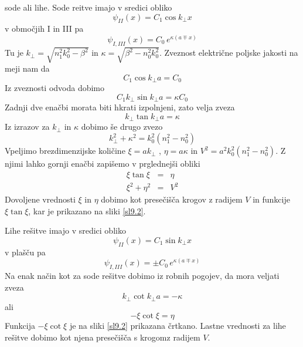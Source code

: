 \documentclass[11pt,fleqn]{book} %
\begin{document}
sode ali lihe. Sode re\textquotedbl{}itve imajo v sredici obliko 
\begin{equation}
\psi_{II}(x)=C_{1}\cos k_{\perp}x\label{9.4}
\end{equation}
 v območjih I in III pa 
\begin{equation}
\psi_{I,III}\left(x\right)=C_{0}\, e^{\kappa\left(a\mp x\right)}\label{9.41}
\end{equation}
 Tu je $k_{\perp}=\sqrt{n_{1}^{2}k_{0}^{2}-\beta^{2}}$ in $\kappa=\sqrt{\beta^{2}-n_{0}^{2}k_{0}^{2}}$.
Zveznost električne poljske jakosti na meji nam da 
\begin{equation}
C_{1}\cos k_{\perp}a=C_{0}\label{9.5}
\end{equation}
 Iz zveznosti odvoda dobimo 
\begin{equation}
C_{1}k_{\perp}\sin k_{\perp}a=\kappa C_{0}\label{9.6}
\end{equation}
 Zadnji dve enačbi morata biti hkrati izpolnjeni, zato velja zveza
\begin{equation}
k_{\perp}\tan k_{\perp}a=\kappa\label{9.7}
\end{equation}
 Iz izrazov za $k_{\perp}$ in $\kappa$ dobimo še drugo zvezo 
\begin{equation}
k_{\perp}^{2}+\kappa^{2}=k_{0}^{2}\left(n_{1}^{2}-n_{0}^{2}\right)\label{9.8}
\end{equation}
 Vpeljimo brezdimenzijske količine $\xi=ak_{\perp}$ , $\eta=a\kappa$
in $V^{2}=a^{2}k_{0}^{2}\left(n_{1}^{2}-n_{0}^{2}\right)$. Z njimi
lahko gornji enačbi zapišemo v prglednejši obliki 
\begin{eqnarray}
\xi\tan\xi & = & \eta\label{9.9}\\
\xi^{2}+\eta^{2} & = & V^{2}
\end{eqnarray}
 Dovoljene vrednosti $\xi$ in $\eta$ dobimo kot presečišča krogov
z radijem $V$ in funkcije $\xi\tan\xi$, kar je prikazano na sliki
\ref{sl9.2}.

Lihe rešitve imajo v sredici obliko 
\begin{equation}
\psi_{II}(x)=C_{1}\sin k_{\perp}x\label{9.11}
\end{equation}
 v plašču pa 
\begin{equation}
\psi_{I,III}\left(x\right)=\pm C_{0}\, e^{\kappa\left(a\mp x\right)}\label{9.12}
\end{equation}
 Na enak način kot za sode rešitve dobimo iz robnih pogojev, da mora
veljati zveza 
\begin{equation}
k_{\perp}\cot k_{\perp}a=-\kappa\label{9.13}
\end{equation}
 ali 
\begin{equation}
-\xi\cot\xi=\eta\label{9.14}
\end{equation}
 Funkcija $-\xi\cot\xi$ je na sliki \ref{sl9.2} prikazana črtkano.
Lastne vrednosti za lihe rešitve dobimo kot njena presečišča s krogomz
radijem $V$.
\end{document}
